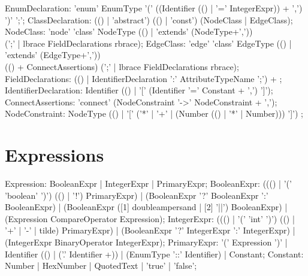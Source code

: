 \documentclass[a4paper,11pt]{report}
\begin{document}
\begin{rail}
  EnumDeclaration: 'enum' EnumType '(' ((Identifier (() | '=' IntegerExpr)) + ',') ')' ';';
  ClassDeclaration: (() | 'abstract') (() | 'const') (NodeClass | EdgeClass);
  NodeClass: 'node' 'class' NodeType (() | 'extends' (NodeType+',')) \\ 
    (';' | lbrace FieldDeclarations rbrace);
  EdgeClass: 'edge' 'class' EdgeType (() | 'extends' (EdgeType+',')) \\
    (() + ConnectAssertions) (';' | lbrace FieldDeclarations rbrace);
  FieldDeclarations: (() | IdentifierDeclaration ':' AttributeTypeName ';') + ; 
  IdentifierDeclaration: Identifier (() | '[' (Identifier '=' Constant + ',') ']'); 
  ConnectAssertions: 'connect' (NodeConstraint '->' NodeConstraint + ',');
  NodeConstraint: NodeType (() | '[' ('*' | '+' | (Number (() | '*' | Number))) ']') ;
\end{rail}

\section{Expressions}
\label{expressions}

\begin{rail}
  Expression: BooleanExpr | IntegerExpr | PrimaryExpr;
  BooleanExpr: ((() | '(' 'boolean' ')') (() | '!') PrimaryExpr) | (BooleanExpr '?' BooleanExpr ':' BooleanExpr) | (BooleanExpr ([1] doubleampersand | [2] '||') BooleanExpr) | (Expression CompareOperator Expression);
  IntegerExpr: ((() | '(' 'int' ')') (() | '+' | '-' | tilde) PrimaryExpr) | (BooleanExpr '?' IntegerExpr ':' IntegerExpr) | (IntegerExpr BinaryOperator IntegerExpr);
  PrimaryExpr: '(' Expression ')' | Identifier (() | ('.' Identifier +)) | (EnumType '::' Identifier) | Constant;
  Constant: Number | HexNumber | QuotedText | 'true' | 'false';
\end{rail}
\end{document}
